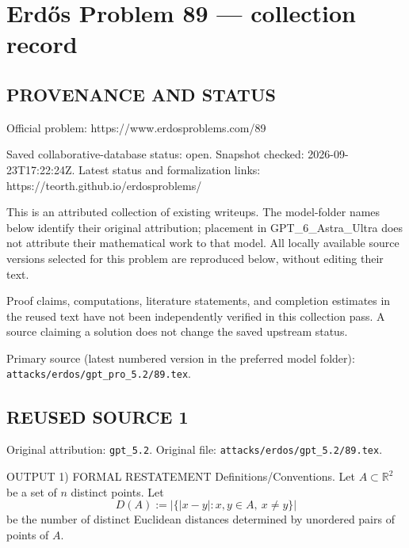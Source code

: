 \section*{Erd\H{o}s Problem 89 --- collection record}

\subsection*{PROVENANCE AND STATUS}
Official problem: https://www.erdosproblems.com/89

Saved collaborative-database status: open.
Snapshot checked: 2026-09-23T17:22:24Z.
Latest status and formalization links: https://teorth.github.io/erdosproblems/

This is an attributed collection of existing writeups. The model-folder names below identify their original attribution; placement in GPT\_6\_Astra\_Ultra does not attribute their mathematical work to that model. All locally available source versions selected for this problem are reproduced below, without editing their text.

Proof claims, computations, literature statements, and completion estimates in the reused text have not been independently verified in this collection pass. A source claiming a solution does not change the saved upstream status.

Primary source (latest numbered version in the preferred model folder): \texttt{attacks/erdos/gpt\_pro\_5.2/89.tex}.

\subsection*{REUSED SOURCE 1}
Original attribution: \texttt{gpt\_5.2}.
Original file: \texttt{attacks/erdos/gpt\_5.2/89.tex}.


OUTPUT
1) FORMAL RESTATEMENT
Definitions/Conventions.
Let $A\subset\mathbb R^2$ be a set of $n$ distinct points.
Let
\[D(A):=\big|\{|x-y|: x,y\in A,\ x\ne y\}\big|\]
be the number of distinct Euclidean distances determined by unordered pairs of points of $A$.

